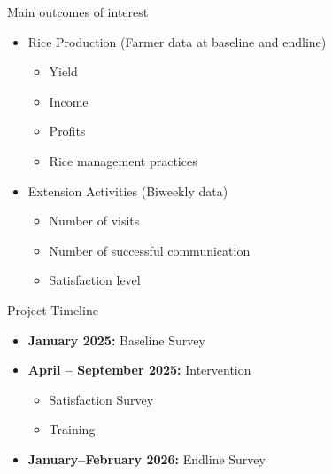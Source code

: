 \documentclass[aspectratio=169]{beamer}
\begin{document}
\begin{frame}{Main outcomes of interest}
	\begin{itemize}
		\item Rice Production (Farmer data at baseline and endline)
		\begin{itemize}
			\item Yield
			\item Income 
			\item Profits
			\item Rice management practices
			\vspace{0.3cm}
		\end{itemize}
		\item Extension Activities (Biweekly data) 
		\begin{itemize}
			\item Number of visits
			\item Number of successful communication
			\item Satisfaction level 
		\end{itemize}
		
		
		
	\end{itemize}
\end{frame}

\begin{frame}{Project Timeline}
	
	\begin{itemize}
		\item \textbf{January 2025:} Baseline Survey
		\vspace{0.3cm}
		
		\item \textbf{April -- September 2025:} Intervention
		\begin{itemize}
			\item Satisfaction Survey
			\item Training
		\end{itemize}
		\vspace{0.3cm}
		
		\item \textbf{January--February 2026:} Endline Survey 
	\end{itemize}
	
\end{frame}
\end{document}
